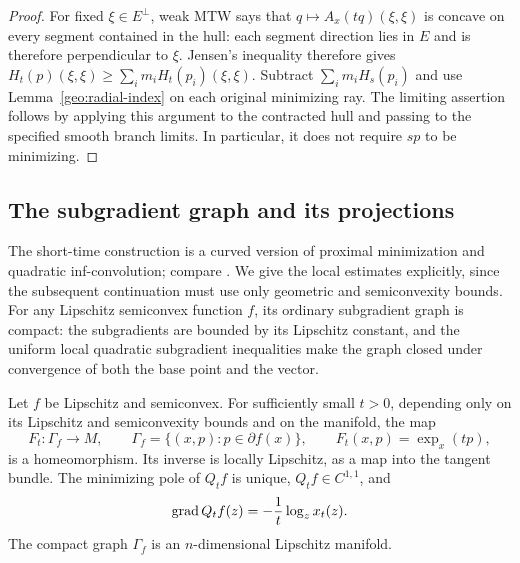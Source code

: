 \begin{proof}
For fixed $\xi\in E^\perp$, weak MTW says that
$q\mapsto A_x(tq)(\xi,\xi)$ is concave on every segment contained
in the hull: each segment direction lies in $E$ and is therefore
perpendicular to $\xi$.  Jensen's inequality therefore gives
$H_t(p)(\xi,\xi)\geq\sum_i m_iH_t(p_i)(\xi,\xi)$.
Subtract $\sum_i m_iH_s(p_i)$ and use
Lemma~\ref{geo:radial-index} on each original minimizing ray.
The limiting assertion follows by applying this argument to the
contracted hull and passing to the specified smooth branch limits.
In particular, it does not require $sp$ to be minimizing.
\end{proof}

\subsection{The subgradient graph and its projections}

The short-time construction is a curved version of proximal minimization
and quadratic inf-convolution; compare \cite[Sections~3--5 and~7]{Moreau1965}.
We give the local estimates explicitly, since the subsequent continuation
must use only geometric and semiconvexity bounds.
For any Lipschitz semiconvex function $f$, its ordinary subgradient
graph is compact: the subgradients are bounded by its Lipschitz constant,
and the uniform local quadratic subgradient inequalities make the graph
closed under convergence of both the base point and the vector.

\begin{lemma}
\label{geo:short-time}
Let $f$ be Lipschitz and semiconvex.  For sufficiently small $t>0$,
depending only on its Lipschitz and semiconvexity bounds and on the
manifold, the map
\[
 F_t:\Gamma_f\longrightarrow M,\qquad
 \Gamma_f=\{(x,p):p\in\partial f(x)\},\qquad
 F_t(x,p)=\exp_x(tp),
\]
is a homeomorphism.  Its inverse is locally Lipschitz, as a map into
the tangent bundle.  The minimizing pole of $Q_tf$ is unique,
$Q_tf\in C^{1,1}$, and
\[
 \operatorname{grad} Q_tf(z)=-\frac1t\log_zx_t(z).
\]
The compact graph $\Gamma_f$ is an $n$-dimensional Lipschitz manifold.
\end{lemma}


